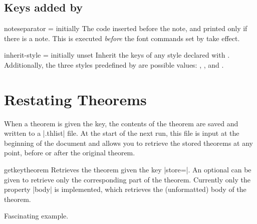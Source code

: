 \documentclass{ltxdoc}
\begin{document}
\subsection{Keys added by }

\begin{docKey}{noteseparator}
  {=}
  {initially \textvisiblespace}
The code inserted before the note, and printed only if there is a note. This is executed \emph{before} the font commands set by  take effect.
\end{docKey}

\begin{docKey}{inherit-style}
  {=}
  {initially unset}
Inherit the keys of any style declared with .
Additionally, the three styles predefined by  are possible values: , , and .
\end{docKey}

\section{Restating Theorems}

When a theorem is given the  key, the contents of the theorem are saved and written to a |.thlist| file.
At the start of the next run, this file is input at the beginning of the document and allows you to retrieve the stored theorems at any point, before or after the original theorem.

\begin{docCommand}{getkeytheorem}
  {}
Retrieves the theorem given the key |store=|.
An optional  can be given to retrieve only the corresponding part of the theorem.
Currently only the property |body| is implemented, which retrieves the (unformatted) body of the theorem.

\begin{keythmscode}[]

\begin{example}[store=mytag]
Fascinating example.
\end{example}

\end{keythmscode}

\end{docCommand}
\end{document}
